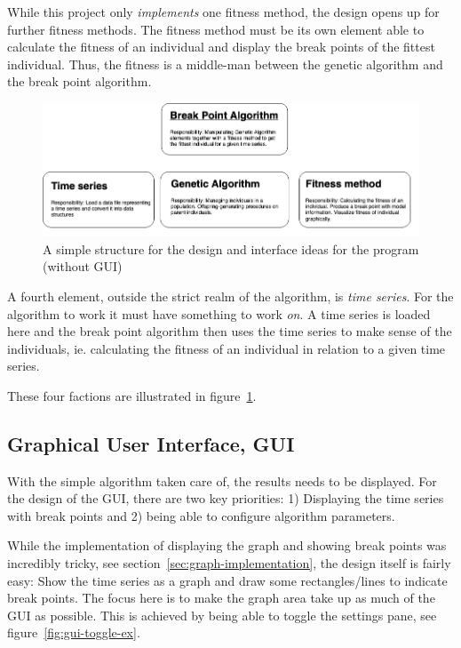 While this project only \textit{implements}
one fitness method, the design opens up for further fitness methods. The fitness
method must be its own element able to calculate the fitness of an individual
and display the break points of the fittest individual. Thus, the fitness is a
middle-man between the genetic algorithm and the break point algorithm. 

\begin{figure}[ht]
    \centering
    \includegraphics[width=\textwidth]{fig/simple-design-structure.png}
    \caption{A simple structure for the design and interface ideas for the program (without GUI)}
    \label{fig:simple-design-structure}
\end{figure}

A fourth element, outside the strict realm of the algorithm, is \textit{time
series}. For the algorithm to work it must have something to work \textit{on}. A
time series is loaded here and the break point algorithm then uses the time
series to make sense of the individuals, ie. calculating the fitness of an
individual in relation to a given time series. 

These four factions are illustrated in
figure~\ref{fig:simple-design-structure}. 


\subsection{Graphical User Interface, GUI} \label{sec:gui-design}

With the simple algorithm taken care of, the results needs to be displayed. For 
the design of the GUI, there are two key priorities: 1) Displaying the time
series with break points and 2) being able to configure algorithm parameters. 

While the implementation of displaying the graph and showing break points was incredibly tricky, see
section~\ref{sec:graph-implementation}, the design itself is fairly easy: Show
the time series as a
graph and draw some rectangles/lines to indicate break points. The focus here is to make the graph area
take up as much of the GUI as possible. This is achieved by being able to toggle
the settings pane, see figure~\ref{fig:gui-toggle-ex}. 

